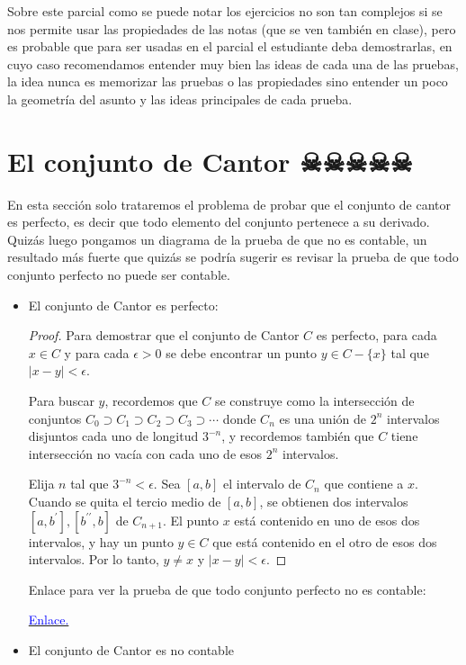 \begin{note}
Sobre este parcial como se puede notar los ejercicios no son tan complejos si se nos permite usar las propiedades de las notas (que se ven también en clase), pero es probable que para ser usadas en el parcial el estudiante deba demostrarlas, en cuyo caso recomendamos entender muy bien las ideas de cada una de las pruebas, la idea nunca es memorizar las pruebas o las propiedades sino entender un poco la geometría del asunto y las ideas principales de cada prueba.
\end{note}

\section{El conjunto de Cantor ☠☠☠☠☠}

\begin{note}
En esta sección solo trataremos el problema de probar que el conjunto de cantor es perfecto, es decir que todo elemento del conjunto pertenece a su derivado. Quizás luego pongamos un diagrama de la prueba de que no es contable, un resultado más fuerte que quizás se podría sugerir es revisar la prueba de que todo conjunto perfecto no puede ser contable.
\end{note}

\begin{itemize}[label={✎}]

\item El conjunto de Cantor es perfecto:\\


\begin{proof}
Para demostrar que el conjunto de Cantor $C$ es perfecto, para cada $x \in C$ y para cada $\epsilon>0$ se debe encontrar un punto $y \in C-\{x\}$ tal que $|x-y|<\epsilon$.

Para buscar $y$, recordemos que $C$ se construye como la intersección de conjuntos $C_0 \supset C_1 \supset C_2 \supset C_3 \supset \cdots$ donde $C_n$ es una unión de $2^n$ intervalos disjuntos cada uno de longitud $3^{-n}$, y recordemos también que $C$ tiene intersección no vacía con cada uno de esos $2^n$ intervalos.

Elija $n$ tal que $3^{-n}<\epsilon$.
Sea $[a, b]$ el intervalo de $C_n$ que contiene a $x$.
Cuando se quita el tercio medio de $[a, b]$, se obtienen dos intervalos $\left[a, b^{\prime}\right],\left[b^{\prime \prime}, b\right]$ de $C_{n+1}$. El punto $x$ está contenido en uno de esos dos intervalos, y hay un punto $y \in C$ que está contenido en el otro de esos dos intervalos. Por lo tanto, $y \neq x$ y $|x-y|<\epsilon$.
\end{proof}

\begin{note}
        Enlace para ver la prueba de que todo conjunto perfecto no es contable: 

        \href{https://math.stackexchange.com/questions/201922/proof-that-a-perfect-set-is-uncountable}{\textcolor{blue}{Enlace.}} 
\end{note}

\item El conjunto de Cantor es no contable
        
\end{itemize}

